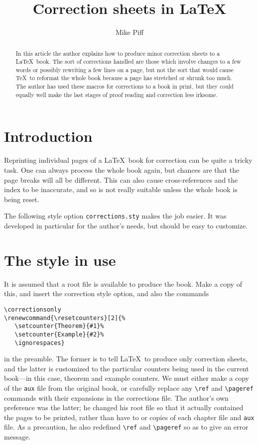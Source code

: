 
\title{Correction sheets in \LaTeX}
\author{Mike Piff}
\address{Department of Pure Mathematics\\University of Sheffield\\Sheffield
   S10 2TN\\England}

\maketitle
\begin{abstract}
   In this article the author explains how to produce minor correction
   sheets to a \LaTeX\ book.
   The sort of corrections handled are those which
   involve changes to a few words or possibly rewriting a few lines on a page,
   but not the sort that would cause \TeX\ to reformat the whole book because
   a page has stretched or shrunk too much. The
   author has used these macros for corrections to a book in print, but they
   could equally well make the last stages of proof reading
   and correction less irksome.
\end{abstract}
\section{Introduction}
Reprinting individual pages of a \LaTeX\ book for correction
can be quite a tricky task. One can always process the whole book again,
but chances are that the page breaks will all be different. This can also
cause
cross-references and the index to be inaccurate, and so is
not really suitable unless the whole book is being reset.

The following style option \verb"corrections.sty" makes the job easier.
It was developed in particular for the author's needs,
but should be easy to customize.

\section{The style in use}
It is assumed that a root file is available to produce the book.
Make a copy of this,
and insert the correction style option, and also the commands
\begin{verbatim}
\correctionsonly
\renewcommand{\resetcounters}[2]{%
   \setcounter{Theorem}{#1}%
   \setcounter{Example}{#2}%
   \ignorespaces}
\end{verbatim}
in the preamble. The former is to tell \LaTeX\ to produce only correction
sheets, and the latter is customized to the particular counters being
used in the
current book---in this case, theorem and example counters.
We must either make a copy of the \verb"aux" file from the original book,
or carefully replace
any \verb"\ref" and \verb"\pageref" commands with
their expansions in the corrections file. The author's own preference was the
latter; he changed his root file so that it actually contained the pages to be
printed, rather than have to \verb"" or \verb"" copies of each
chapter file and \verb"aux" file. As a precaution, he also redefined \verb"\ref"
and \verb"\pageref" so as to give an error message.

